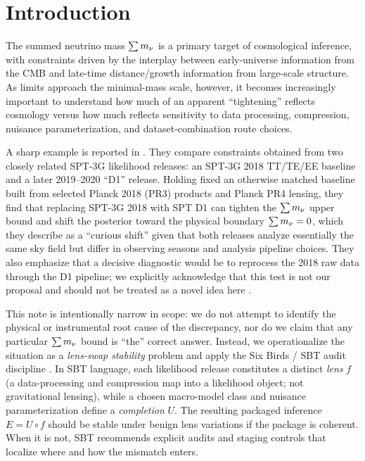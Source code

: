 \section{Introduction}
\label{sec:intro}

The summed neutrino mass $\sum m_\nu$ is a primary target of cosmological inference, with constraints driven by the interplay between early-universe information from the CMB and late-time distance/growth information from large-scale structure. As limits approach the minimal-mass scale, however, it becomes increasingly important to understand how much of an apparent ``tightening'' reflects cosmology versus how much reflects sensitivity to data processing, compression, nuisance parameterization, and dataset-combination route choices.

A sharp example is reported in \cite{arxiv2601_16277}. They compare constraints obtained from two closely related SPT-3G likelihood releases: an SPT-3G 2018 TT/TE/EE baseline and a later 2019--2020 ``D1'' release. Holding fixed an otherwise matched baseline built from selected Planck 2018 (PR3) products and Planck PR4 lensing, they find that replacing SPT-3G 2018 with SPT D1 can tighten the $\sum m_\nu$ upper bound and shift the posterior toward the physical boundary $\sum m_\nu=0$, which they describe as a ``curious shift'' given that both releases analyze essentially the same sky field but differ in observing seasons and analysis pipeline choices. They also emphasize that a decisive diagnostic would be to reprocess the 2018 raw data through the D1 pipeline; we explicitly acknowledge that this test is not our proposal and should not be treated as a novel idea here \cite{arxiv2601_16277}.

This note is intentionally narrow in scope: we do not attempt to identify the physical or instrumental root cause of the discrepancy, nor do we claim that any particular $\sum m_\nu$ bound is ``the'' correct answer. Instead, we operationalize the situation as a \emph{lens-swap stability} problem and apply the Six Birds / SBT audit discipline \cite{sixbirds_foundations,sixbirds_darkenergy}. In SBT language, each likelihood release constitutes a distinct \emph{lens} $f$ (a data-processing and compression map into a likelihood object; not gravitational lensing), while a chosen macro-model class and nuisance parameterization define a \emph{completion} $U$. The resulting packaged inference $E = U\circ f$ should be stable under benign lens variations if the package is coherent. When it is not, SBT recommends explicit audits and staging controls that localize where and how the mismatch enters.

